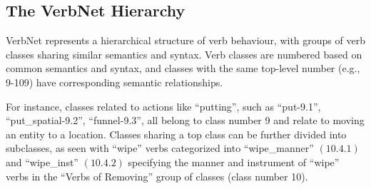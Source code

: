 
\subsection*{The VerbNet Hierarchy}
VerbNet represents a hierarchical structure of verb behaviour, with groups of verb classes sharing similar semantics and syntax. Verb classes are numbered based on common semantics and syntax, and classes with the same top-level number (e.g., 9-109) have corresponding semantic relationships. 

For instance, classes related to actions like \enquote{putting}, such as \enquote{put-9.1}, \enquote{put\_spatial-9.2}, \enquote{funnel-9.3}, all belong to class number 9 and relate to moving an entity to a location. Classes sharing a top class can be further divided into subclasses, as seen with \enquote{wipe} verbs categorized into \enquote{wipe\_manner} $(10.4.1)$ and \enquote{wipe\_inst} $(10.4.2)$ specifying the manner and instrument of \enquote{wipe} verbs in the \enquote{Verbs of Removing} group of classes (class number 10).

